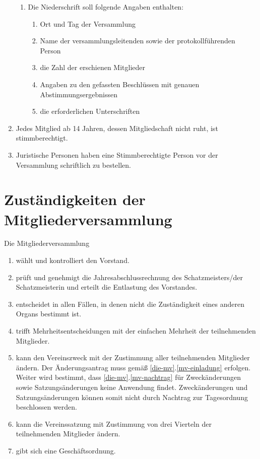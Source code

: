 \documentclass[a4paper, 12pt]{scrartcl}
\begin{document}
\begin{enumerate}
\begin{enumerate}
			\item Die Niederschrift soll folgende Angaben enthalten:
			\begin{enumerate}
	  		\item Ort und Tag der Versammlung
	    	\item Name der versammlungsleitenden sowie der protokollführenden Person
	    	\item die Zahl der erschienen Mitglieder
	    	\item Angaben zu den gefassten Beschlüssen mit genauen Abstimmungsergebnissen
	    	\item die erforderlichen Unterschriften
			\end{enumerate}
		\end{enumerate}
	\item Jedes Mitglied ab 14 Jahren, dessen Mitgliedschaft nicht ruht, ist stimmberechtigt.
	\item Juristische Personen haben eine Stimmberechtigte Person vor der Versammlung schriftlich zu bestellen.
\end{enumerate}

\section{Zuständigkeiten der Mitgliederversammlung}
Die Mitgliederversammlung
\begin{enumerate}
	\item wählt und kontrolliert den Vorstand.
	\item prüft und genehmigt die Jahresabschlussrechnung des Schatzmeisters/der Schatzmeisterin und erteilt die Entlastung des Vorstandes.
	\item entscheidet in allen Fällen, in denen nicht die Zuständigkeit eines anderen Organs bestimmt ist.
	\item trifft Mehrheitsentscheidungen mit der einfachen Mehrheit der teilnehmenden Mitglieder.
	\item kann den Vereinszweck mit der Zustimmung aller teilnehmenden
    Mitglieder ändern. Der Änderungsantrag muss gemäß
    \ref{die-mv}.\ref{mv-einladung} erfolgen. Weiter wird bestimmt, dass
    \ref{die-mv}.\ref{mv-nachtrag} für Zweckänderungen sowie
    Satzungsänderungen keine Anwendung findet. Zweckänderungen und
    Satzungsänderungen können somit nicht durch Nachtrag zur Tagesordnung beschlossen werden.
	\item kann die Vereinssatzung mit Zustimmung von drei Vierteln der teilnehmenden Mitglieder ändern. 
	\item gibt sich eine Geschäftsordnung.
\end{enumerate}
\end{document}
